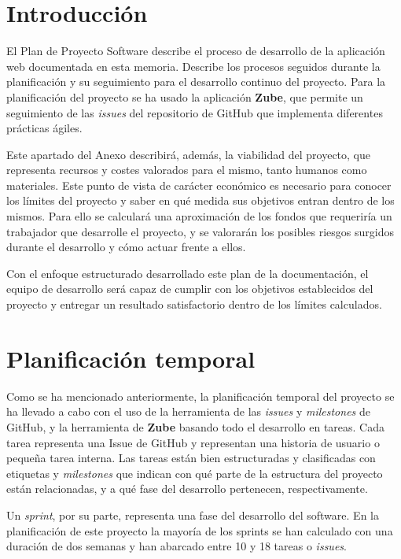 
\section{Introducción}
El Plan de Proyecto Software describe el proceso de desarrollo de la aplicación web documentada en esta memoria. Describe los procesos seguidos durante la planificación y su seguimiento para el desarrollo continuo del proyecto.
Para la planificación del proyecto se ha usado la aplicación \textbf{Zube}, que permite un seguimiento de las \textit{issues} del repositorio de GitHub que implementa diferentes prácticas ágiles.

Este apartado del Anexo describirá, además, la viabilidad del proyecto, que representa recursos y costes valorados para el mismo, tanto humanos como materiales. Este punto de vista de carácter económico es necesario para conocer los límites del proyecto y saber en qué medida sus objetivos entran dentro de los mismos. Para ello se calculará una aproximación de los fondos que requeriría un trabajador que desarrolle el proyecto, y se valorarán los posibles riesgos surgidos durante el desarrollo y cómo actuar frente a ellos.

Con el enfoque estructurado desarrollado este plan de la documentación, el equipo de desarrollo será capaz de cumplir con los objetivos establecidos del proyecto y entregar un resultado satisfactorio dentro de los límites calculados.

\section{Planificación temporal}
 Como se ha mencionado anteriormente, la planificación temporal del proyecto se ha llevado a cabo con el uso de la herramienta de las \textit{issues} y \textit{milestones} de GitHub, y la herramienta de \textbf{Zube} basando todo el desarrollo en tareas. Cada tarea representa una Issue de GitHub y representan una historia de usuario o pequeña tarea interna. Las tareas están bien estructuradas y clasificadas con etiquetas y \textit{milestones} que indican con qué parte de la estructura del proyecto están relacionadas, y a qué fase del desarrollo pertenecen, respectivamente.

 Un \textit{sprint}, por su parte, representa una fase del desarrollo del software. En la planificación de este proyecto la mayoría de los sprints se han calculado con una duración de dos semanas y han abarcado entre 10 y 18 tareas o \textit{issues}.

